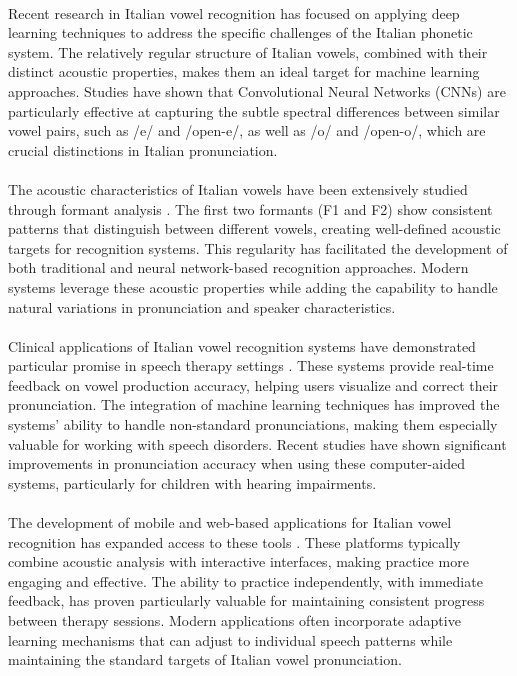 \paragraph{}
Recent research in Italian vowel recognition has focused on applying deep learning techniques to address the specific challenges of the Italian phonetic system. The relatively regular structure of Italian vowels, combined with their distinct acoustic properties, makes them an ideal target for machine learning approaches. Studies have shown that Convolutional Neural Networks (CNNs) are particularly effective at capturing the subtle spectral differences between similar vowel pairs, such as /e/ and /open-e/, as well as /o/ and /open-o/, which are crucial distinctions in Italian pronunciation.

\paragraph{}
The acoustic characteristics of Italian vowels have been extensively studied through formant analysis \cite{formant_analysis2022}. The first two formants (F1 and F2) show consistent patterns that distinguish between different vowels, creating well-defined acoustic targets for recognition systems. This regularity has facilitated the development of both traditional and neural network-based recognition approaches. Modern systems leverage these acoustic properties while adding the capability to handle natural variations in pronunciation and speaker characteristics.

\paragraph{}
Clinical applications of Italian vowel recognition systems have demonstrated particular promise in speech therapy settings \cite{italian_therapy2023}. These systems provide real-time feedback on vowel production accuracy, helping users visualize and correct their pronunciation. The integration of machine learning techniques has improved the systems' ability to handle non-standard pronunciations, making them especially valuable for working with speech disorders. Recent studies have shown significant improvements in pronunciation accuracy when using these computer-aided systems, particularly for children with hearing impairments.

\paragraph{}
The development of mobile and web-based applications for Italian vowel recognition has expanded access to these tools \cite{mobile_speech2022}. These platforms typically combine acoustic analysis with interactive interfaces, making practice more engaging and effective. The ability to practice independently, with immediate feedback, has proven particularly valuable for maintaining consistent progress between therapy sessions. Modern applications often incorporate adaptive learning mechanisms that can adjust to individual speech patterns while maintaining the standard targets of Italian vowel pronunciation.

